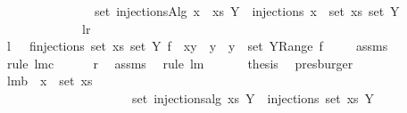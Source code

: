 \begin{isabellebody}
\ \ \ \ \ \ \ \ \ \ \ \ \ \ \ {\isachardoublequoteopen}set\ {\isacharparenleft}injectionsAlg\ {\isacharparenleft}x\ {\isacharhash}\ xs{\isacharparenright}\ Y{\isacharparenright}\ {\isacharequal}\ injections\ {\isacharparenleft}{\isacharbraceleft}x{\isacharbraceright}\ {\isasymunion}\ set\ xs{\isacharparenright}\ {\isacharparenleft}set\ Y{\isacharparenright}{\isachardoublequoteclose}\ \isanewline
\ \ \ \ \ \ \ \ \ \ \ \ {\isacharparenleft}\ {\isachardoublequoteopen}{\isacharquery}l{\isacharequal}{\isacharquery}r{\isachardoublequoteclose}{\isacharparenright}\isanewline
%
\isadelimproof
%
\endisadelimproof
%
\isatagproof
{}\isamarkupfalse%
\ {\isacharminus}\ \isanewline
\ \ \isamarkupfalse%
\ {\isachardoublequoteopen}{\isacharquery}l\ {\isacharequal}\ {\isacharparenleft}{\isasymUnion}\ f{\isasymin}injections\ {\isacharparenleft}set\ xs{\isacharparenright}\ {\isacharparenleft}set\ Y{\isacharparenright}{\isachardot}\ {\isacharbraceleft}f\ {\isasymunion}\ {\isacharbraceleft}{\isacharparenleft}x{\isacharcomma}y{\isacharparenright}{\isacharbraceright}\ {\isacharbar}\ y\ {\isachardot}\ y\ {\isasymin}\ {\isacharparenleft}set\ Y{\isacharparenright}{\isacharminus}Range\ f{\isacharbraceright}{\isacharparenright}{\isachardoublequoteclose}\ \isanewline
\ \ \isamarkupfalse%
\ assms{\isacharparenleft}{}{\isacharparenright}\ \isamarkupfalse%
\ {\isacharparenleft}rule\ lm{}{}c{\isacharparenright}\ \isamarkupfalse%
\ \isamarkupfalse%
\ {\isachardoublequoteopen}{\isachardot}{\isachardot}{\isachardot}\ {\isacharequal}\ {\isacharquery}r{\isachardoublequoteclose}\ \isamarkupfalse%
\ assms{\isacharparenleft}{}{\isacharparenright}\ \isamarkupfalse%
\ {\isacharparenleft}rule\ lm{}{}{\isacharparenright}\ \isanewline
\ \ \isamarkupfalse%
\ \isamarkupfalse%
\ {\isacharquery}thesis\ \isamarkupfalse%
\ presburger\isanewline
{}\isamarkupfalse%
%
\endisatagproof
{\isafoldproof}%
%
\isadelimproof
\isanewline
%
\endisadelimproof
\isanewline
{}\isamarkupfalse%
\ lm{}{}b{\isacharcolon}\ \ {\isachardoublequoteopen}x\ {\isasymnotin}\ set\ xs{\isachardoublequoteclose}\ \isanewline
\ \ \ \ \ \ \ \ \ \ \ \ \ \ \ \ \ \ \ \ \ {\isachardoublequoteopen}set\ {\isacharparenleft}injections{\isacharunderscore}alg\ xs\ Y{\isacharparenright}\ {\isacharequal}\ injections\ {\isacharparenleft}set\ xs{\isacharparenright}\ Y{\isachardoublequoteclose}\ \isanewline

\end{isabellebody}
